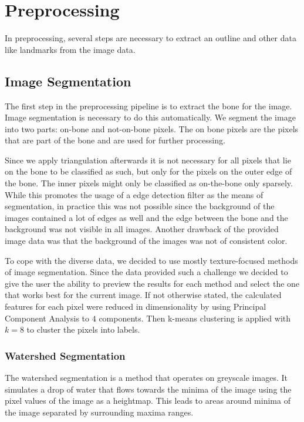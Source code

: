 \documentclass[pdftex,12pt,a4paper]{report}
\begin{document}
\section{Preprocessing}

In preprocessing, several steps are necessary to extract an outline and other data like landmarks from the image data.

\subsection{Image Segmentation}
\label{sub:segmentation}

The first step in the preprocessing pipeline is to extract the bone for the image. Image segmentation
is necessary to do this automatically. We segment the image into two parts: on-bone and not-on-bone pixels.
The on bone pixels are the pixels that are part of the bone and are used for further processing.

Since we apply triangulation afterwards it is not necessary for all pixels that lie on the bone
to be classified as such, but only for the pixels on the outer edge of the bone. The inner pixels
might only be classified as on-the-bone only sparsely. While this promotes the usage of a edge detection
filter as the means of segmentation, in practice this was not possible since the background of the
images contained a lot of edges as well and the edge between the bone and the background was not
visible in all images. Another drawback of the provided image data was that the background of the images
was not of consistent color.

To cope with the diverse data, we decided to use mostly texture-focused methods of image segmentation. Since the data provided such a challenge we decided to give the user the ability to preview the results for each method and select the one that works best for the current image. If not otherwise stated, the calculated features for each pixel were reduced in dimensionality by using Principal Component Analysis to $4$ components. Then k-means clustering is applied with $k=8$ to cluster the pixels into labels.

\subsubsection{Watershed Segmentation}
\label{subsub:segmentationwatershed}

The watershed segmentation is a method that operates on greyscale images. It simulates a drop of water that flows towards the minima of the image using the pixel values of the image as a heightmap. This leads to areas around minima of the image separated by surrounding maxima ranges.
\end{document}
